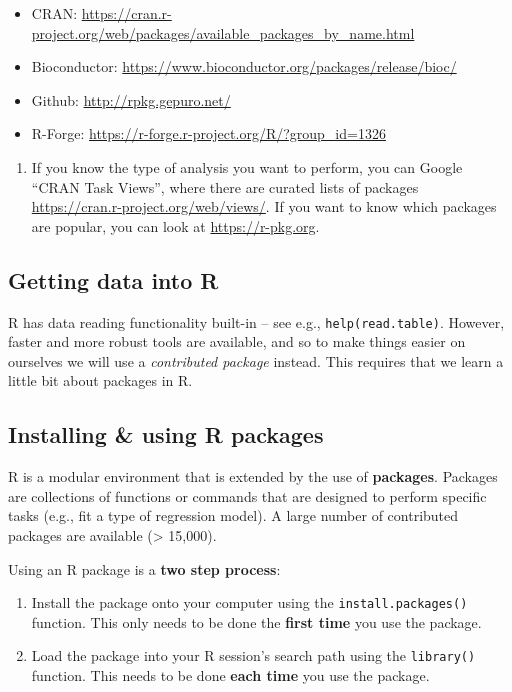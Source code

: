 \documentclass[]{book}
\providecommand{\tightlist}{%
  \setlength{\itemsep}{0pt}\setlength{\parskip}{0pt}}
\begin{document}
\begin{itemize}
\tightlist
\item
  CRAN: \url{https://cran.r-project.org/web/packages/available_packages_by_name.html}
\item
  Bioconductor: \url{https://www.bioconductor.org/packages/release/bioc/}
\item
  Github: \url{http://rpkg.gepuro.net/}
\item
  R-Forge: \url{https://r-forge.r-project.org/R/?group_id=1326}
\end{itemize}

\begin{enumerate}
\def\labelenumi{\arabic{enumi}.}
\setcounter{enumi}{2}
\tightlist
\item
  If you know the type of analysis you want to perform, you can Google ``CRAN Task Views'',
  where there are curated lists of packages \url{https://cran.r-project.org/web/views/}. If you want to
  know which packages are popular, you can look at \url{https://r-pkg.org}.
\end{enumerate}

\hypertarget{getting-data-into-r}{%
\subsection{Getting data into R}\label{getting-data-into-r}}

R has data reading functionality built-in -- see e.g.,
\texttt{help(read.table)}. However, faster and more robust tools are
available, and so to make things easier on ourselves we will use a
\emph{contributed package} instead. This requires that we
learn a little bit about packages in R.

\hypertarget{installing-using-r-packages}{%
\subsection{Installing \& using R packages}\label{installing-using-r-packages}}

R is a modular environment that is extended by the use of \textbf{packages}.
Packages are collections of functions or commands that are designed to
perform specific tasks (e.g., fit a type of regression model). A large
number of contributed packages are available (\textgreater{} 15,000).

Using an R package is a \textbf{two step process}:

\begin{enumerate}
\def\labelenumi{\arabic{enumi}.}
\item
  Install the package onto your computer using the
  \texttt{install.packages()} function. This only needs to
  be done the \textbf{first time} you use the package.
\item
  Load the package into your R session's search path
  using the \texttt{library()} function. This needs to be done
  \textbf{each time} you use the package.
\end{enumerate}
\end{document}
